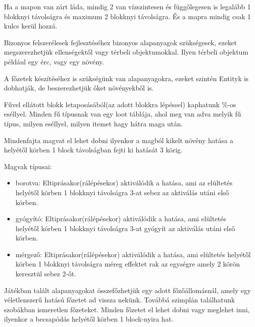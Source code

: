 
Ha a mapon van zárt láda, mindig 2 van vízszintesen és függőlegesen is legalább 1 blokknyi távolságra és maximum 2 blokknyi távolságra. És a mapra mindig csak 1 kulcs kerül hozzá.



Bizonyos felszerélesek fejlesztéséhez bizonyos alapanyagok szükségesek, ezeket megszerezhetjük ellenségektől vagy térbeli objektumokkal.
Ilyen térbeli objektum például egy érc, vagy egy növény.

A főzetek készítéséhez is szükségünk van alapanyagokra, ezeket szintén Entityk is dobhatják, de beszerezhetjük őket növényekből is.


Fűvel ellátott blokk letaposásából(az adott blokkra lépéssel) kaphatunk \%-os eséllyel.
Minden fű típusnak van egy loot táblája, ahol meg van adva melyik fű típus, milyen eséllyel, milyen itemet hagy hátra maga után.

Mindenfajta magvat el lehet dobni ilyenkor a magból kikelt növény hatása a helyétől körben 1 block távolságban fejti ki hatását 3 körig.

Magvak típusai:

\begin{itemize}
\item borotva: Eltiprásakor(rálépésekor) aktiválódik a hatása, ami az elültetés helyétől körben 1 blokknyi távolságra 3-at sebez az aktiválás utáni első körben.
\item gyógyító: Eltiprásakor(rálépésekor) aktiválódik a hatása, ami elültetés helyétől körben 1 blokknyi távolságra 3-at gyógyít az aktiválás utáni első körben.
\item mérgező: Eltiprásakor(rálépésekor) aktiválódik a hatása, ami elültetés helyétől körben 1 blokknyi távolságra méreg effektet rak az egységre amely 2 körön keresztül sebez 2-őt.
\end{itemize}



Játékban talált alapanyagokat összefőzhetjük egy adott főzőállomásnál, amely egy véletlenszerű hatású főzetet ad vissza nekünk.
Továbbá szimplán találhatunk szobákban ismeretlen főzeteket.
Minden főzetet el lehet dobni vagy meglehet inni, ilyenkor a becsapódás helyétől körben 1 block-nyira hat.

